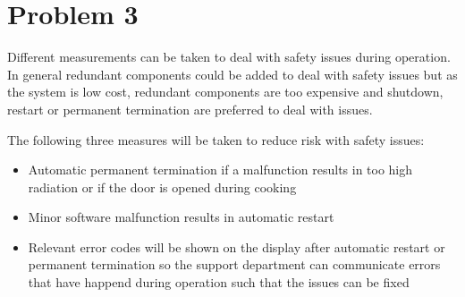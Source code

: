 \chapter{Problem 3}
\label{chp:three}


Different measurements can be taken to deal with safety issues during operation. In general redundant components could be added to deal with safety issues but as the system is low cost, redundant components are too expensive and shutdown, restart or permanent termination are preferred to deal with issues.

The following three measures will be taken to reduce risk with safety issues:

\begin{itemize}
	\item Automatic permanent termination if a malfunction results in too high radiation or if the door is opened during cooking
	\item Minor software malfunction results in automatic restart
	\item Relevant error codes will be shown on the display after automatic restart or permanent termination so the support department can communicate errors that have happend during operation such that the issues can be fixed
\end{itemize}